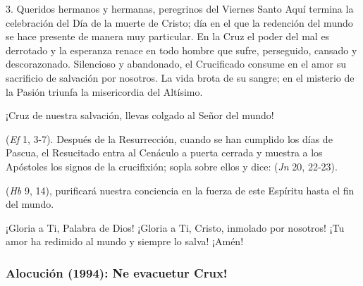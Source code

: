 \begin{body}
3. Queridos hermanos y hermanas, peregrinos del Viernes Santo  Aquí termina la celebración del Día de la muerte de Cristo; día en el que la redención del mundo se hace presente de manera muy particular. En la Cruz el poder del mal es derrotado y la esperanza renace en todo hombre que sufre, perseguido, cansado y descorazonado. Silencioso y abandonado, el Crucificado consume en el amor su sacrificio de salvación por nosotros. La vida brota de su sangre; en el misterio de la Pasión triunfa la misericordia del Altísimo. 

¡Cruz de nuestra salvación, llevas colgado al Señor del mundo!

 (\textit{Ef} 1, 3-7). Después de la Resurrección, cuando se han cumplido los días de Pascua, el Resucitado entra al Cenáculo a puerta cerrada y muestra a los Apóstoles los signos de la crucifixión; sopla sobre ellos y dice:  (\textit{Jn} 20, 22-23). 

 (\textit{Hb} 9, 14), purificará nuestra conciencia en la fuerza de este Espíritu hasta el fin del mundo. 

¡Gloria a Ti, Palabra de Dios! ¡Gloria a Ti, Cristo, inmolado por nosotros! ¡Tu amor ha redimido al mundo y siempre lo salva! ¡Amén!
\end{body}


\subsubsection{Alocución (1994): Ne evacuetur Crux!}


